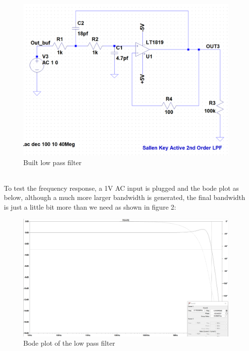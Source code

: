 \documentclass[pdftex,12pt,a4paper]{article}
\begin{document}
\begin{figure}[H]
\centering
\includegraphics[width=12cm]{lpf.png}
\caption{Built low pass filter}
\end{figure}
~\\ To test the frequency response, a 1V AC input is plugged and the bode plot as below, although a much more larger bandwidth is generated, the final bandwidth is just a little bit more than we need as shown in figure 2:
\begin{figure}[H]
\centering
\includegraphics[width=12cm]{bode.png}
\caption{Bode plot of the low pass filter}
\end{figure}
\end{document}
